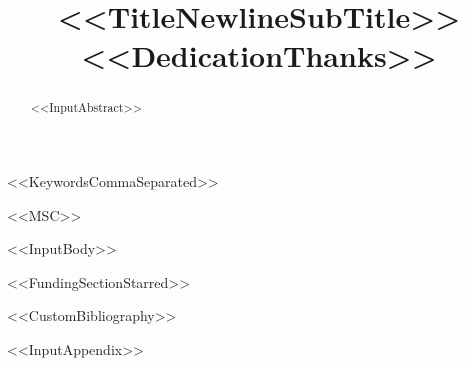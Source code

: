 \documentclass[<<DocumentClassOptions>>]{interact}
\begin{document}

\title{<<TitleNewlineSubTitle>><<DedicationThanks>>}

\author{%
}

\maketitle

\begin{abstract}
<<InputAbstract>>
\end{abstract}

\begin{keywords}
<<KeywordsCommaSeparated>>
\end{keywords}

\begin{amscode}
<<MSC>>
\end{amscode}

<<InputBody>>

<<FundingSectionStarred>>


<<CustomBibliography>>

\appendix
<<InputAppendix>>
\end{document}
